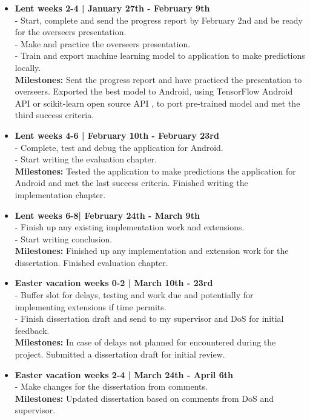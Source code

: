 \documentclass[12pt,a4paper,twoside]{article}
\begin{document}
\begin{itemize}
\item \textbf{Lent weeks 2-4 | January 27th - February 9th}\\
- Start, complete and send the progress report by February 2nd and be ready for the overseers presentation. \\
- Make and practice the overseers presentation.\\
- Train and export machine learning model to application to make predictions locally.\\
\textbf{Milestones:} Sent the progress report and have practiced the presentation to overseers. Exported the best model to Android, using TensorFlow Android API or scikit-learn open source API \cite{tensorflow,skitlearnandroid}, to port pre-trained model and met the third success criteria.
\item \textbf{Lent weeks 4-6 | February 10th - February 23rd}\\
- Complete, test and debug the application for Android.\\
- Start writing the evaluation chapter.\\
\textbf{Milestones: }Tested the application to make predictions the application for Android and met the last success criteria. Finished writing the implementation chapter. \\
\item \textbf{Lent weeks 6-8| February 24th - March 9th}\\
- Finish up any existing implementation work and extensions.\\
- Start writing conclusion.\\
\textbf{Milestones:} Finished up any implementation and extension work for the dissertation.  Finished evaluation chapter.
\item \textbf{Easter vacation weeks 0-2 | March 10th - 23rd}\\
- Buffer slot for delays, testing and work due and potentially for implementing extensions if time permits.\\
- Finish dissertation draft and send to my supervisor and DoS for initial feedback.\\
\textbf{Milestones: } In case of delays not planned for encountered during the project. Submitted a dissertation draft for initial review.
\item \textbf{Easter vacation weeks 2-4 | March 24th - April 6th}\\
- Make changes for the dissertation from comments.\\
\textbf{Milestones:} Updated dissertation based on comments from DoS and supervisor.

\end{itemize}
\end{document}
